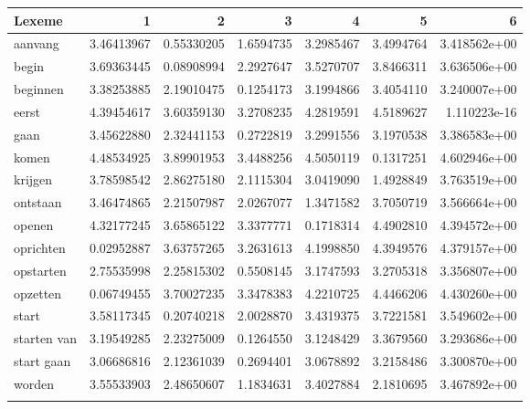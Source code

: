 \begin{tabularx}{\textwidth}{Xrrrrrr}
\lsptoprule
Lexeme        & 1          & 2          & 3         & 4         & 5         & 6            \\ \midrule
aanvang       & 3.46413967 & 0.55330205 & 1.6594735 & 3.2985467 & 3.4994764 & 3.418562e+00 \\
begin         & 3.69363445 & 0.08908994 & 2.2927647 & 3.5270707 & 3.8466311 & 3.636506e+00 \\          
beginnen      & 3.38253885 & 2.19010475 & 0.1254173 & 3.1994866 & 3.4054110 & 3.240007e+00 \\       
eerst         & 4.39454617 & 3.60359130 & 3.2708235 & 4.2819591 & 4.5189627 & 1.110223e-16 \\      
gaan          & 3.45622880 & 2.32441153 & 0.2722819 & 3.2991556 & 3.1970538 & 3.386583e+00 \\
komen         & 4.48534925 & 3.89901953 & 3.4488256 & 4.5050119 & 0.1317251 & 4.602946e+00 \\     
krijgen       & 3.78598542 & 2.86275180 & 2.1115304 & 3.0419090 & 1.4928849 & 3.763519e+00 \\  
ontstaan      & 3.46474865 & 2.21507987 & 2.0267077 & 1.3471582 & 3.7050719 & 3.566664e+00 \\      
openen        & 4.32177245 & 3.65865122 & 3.3377771 & 0.1718314 & 4.4902810 & 4.394572e+00 \\
oprichten     & 0.02952887 & 3.63757265 & 3.2631613 & 4.1998850 & 4.3949576 & 4.379157e+00 \\
opstarten     & 2.75535998 & 2.25815302 & 0.5508145 & 3.1747593 & 3.2705318 & 3.356807e+00 \\
opzetten      & 0.06749455 & 3.70027235 & 3.3478383 & 4.2210725 & 4.4466206 & 4.430260e+00 \\       
start         & 3.58117345 & 0.20740218 & 2.0028870 & 3.4319375 & 3.7221581 & 3.549602e+00 \\ 
starten van   & 3.19549285 & 2.23275009 & 0.1264550 & 3.1248429 & 3.3679560 & 3.293686e+00 \\
start gaan    & 3.06686816 & 2.12361039 & 0.2694401 & 3.0678892 & 3.2158486 & 3.300870e+00 \\
worden        & 3.55533903 & 2.48650607 & 1.1834631 & 3.4027884 & 2.1810695 & 3.467892e+00 \\
\lspbottomrule
\end{tabularx}

